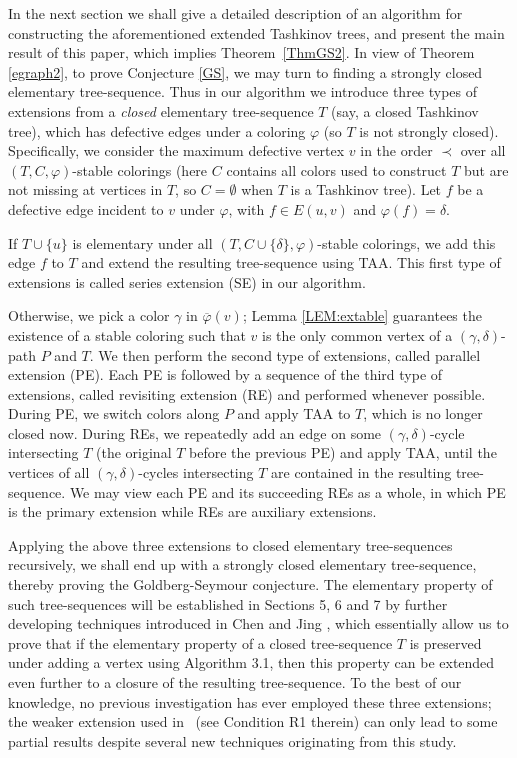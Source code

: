 \documentclass[11pt]{article}
\newcommand{\phibar}{\overline{\varphi}}
\begin{document}
In the next section we shall give a detailed description of an algorithm for constructing the aforementioned extended Tashkinov trees, and present the main
result of this paper, which implies Theorem~\ref{ThmGS2}. In view of Theorem \ref{egraph2}, to prove Conjecture \ref{GS}, we may turn to finding a strongly 
closed elementary tree-sequence. Thus in our algorithm we introduce three types of extensions from a {\em closed} elementary tree-sequence $T$ (say, 
a closed Tashkinov tree), which has defective edges under a coloring $\varphi$ (so $T$ is not strongly closed). Specifically, we consider the maximum defective vertex $v$ in the order $\prec$ 
over all $(T,C,\varphi)$-stable colorings (here $C$ contains all colors used to construct $T$ but are not missing at vertices in $T$, so $C=\emptyset$ when 
$T$ is a Tashkinov tree). Let $f$ be a defective edge incident to $v$ under $\varphi$, with $f\in E(u,v)$ and $\varphi(f)=\delta$. 

If $T\cup \{u\}$ is elementary under all $(T,C\cup\{\delta\},\varphi)$-stable colorings, we add this edge $f$ to $T$ and extend the resulting tree-sequence 
using TAA. This first type of extensions is called series extension (SE) in our algorithm.

Otherwise, we pick a color $\gamma$ in $\phibar(v)$; Lemma \ref{LEM:extable} guarantees the existence of a stable coloring such that $v$ is the only common 
vertex of a $(\gamma,\delta)$-path $P$ and $T$. We then perform the second type of extensions, called parallel extension (PE). Each PE is followed by a sequence of
the third type of extensions, called revisiting extension (RE) and performed whenever possible. During PE, we switch colors along $P$ and apply TAA to $T$, 
which is no longer closed now. During REs, we repeatedly add an edge on some $(\gamma,\delta)$-cycle intersecting $T$ (the original $T$ before the previous 
PE) and apply TAA, until the vertices of all $(\gamma,\delta)$-cycles intersecting $T$ are contained in the resulting tree-sequence.  
We may view each PE and its succeeding REs as a whole, in which PE is the primary extension while REs are auxiliary extensions.   

Applying the above three extensions to closed elementary tree-sequences recursively, we shall end up with a strongly closed elementary tree-sequence, 
thereby proving the Goldberg-Seymour conjecture.  The elementary property of such tree-sequences will be established in Sections 5, 6 and 7 by
further developing techniques introduced in Chen and Jing \cite{GG}, which essentially allow us to prove that if the elementary property of a closed tree-sequence $T$
is preserved under adding a vertex using Algorithm 3.1, then this property can be extended even further to a closure of the resulting tree-sequence. To the 
best of our knowledge, no previous investigation has ever employed these three extensions; the weaker extension used in~\cite{GG} (see Condition R1 therein) 
can only lead to some partial results despite several new techniques originating from this study. 
\end{document}
